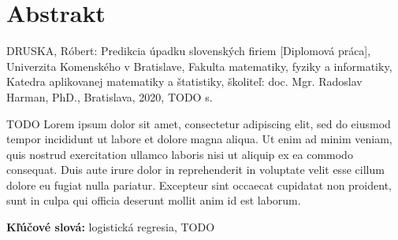 \thispagestyle{empty}
\section*{Abstrakt}
DRUSKA, Róbert: Predikcia úpadku slovenských firiem [Diplomová práca],
Univerzita Komenského v Bratislave,
Fakulta matematiky, fyziky a informatiky,
Katedra aplikovanej matematiky a štatistiky,
školiteľ: doc. Mgr. Radoslav Harman, PhD.,
Bratislava, 2020, TODO s.

TODO Lorem ipsum dolor sit amet, consectetur adipiscing elit, sed do eiusmod tempor incididunt ut labore et dolore magna aliqua. Ut enim ad minim veniam, quis nostrud exercitation ullamco laboris nisi ut aliquip ex ea commodo consequat. Duis aute irure dolor in reprehenderit in voluptate velit esse cillum dolore eu fugiat nulla pariatur. Excepteur sint occaecat cupidatat non proident, sunt in culpa qui officia deserunt mollit anim id est laborum.

\begin{flushleft}
  \textbf{Kľúčové slová:} logistická regresia, TODO
\end{flushleft}